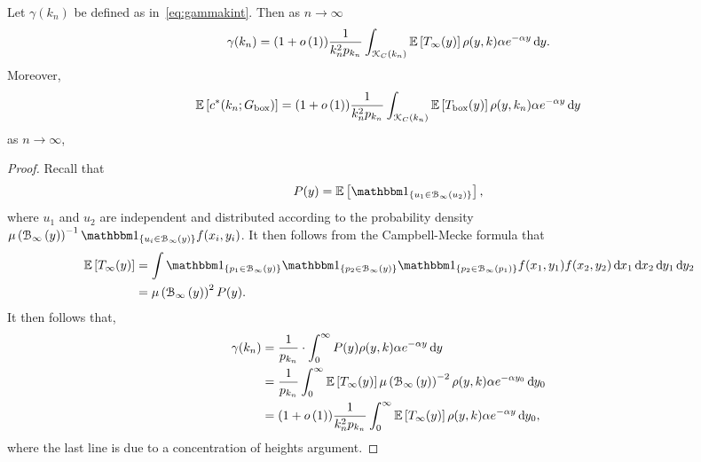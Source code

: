 \begin{lemma}
Let $\gamma(k_n)$ be defined as in~\eqref{eq:gammakint}. Then as $n \to \infty$
\begin{equation}\label{eq:alt_gamma_kn}
	\gamma(k_n) = (1+o\left(1\right))\frac{1}{k_n^2 p_{k_n}} \int_{{\mathcal K}_{C}(k_n)} \mathbb{E}\left[T_\infty(y)\right] \rho(y,k) 
				\alpha e^{-\alpha y} \operatorname{\mathrm{d}\hspace{-2pt}} y. 
\end{equation}
Moreover,
\begin{equation}\label{eq:alt_c_ast_kn}
	\mathbb{E}\left[c^\ast(k_n;G_{\text{box}})\right] = (1 + o\left(1\right)) \frac{1}{k_n^2 p_{k_n}} \int_{{\mathcal K}_{C}(k_n)} \mathbb{E}\left[T_{\text{box}}(y)\right]
		\rho(y,k_n) \alpha e^{-\alpha y} \operatorname{\mathrm{d}\hspace{-2pt}} y
\end{equation}
as $n \to \infty$,
\end{lemma}

\begin{proof}
Recall that 
\[
	P(y) = \Exp{\ind{u_1 \in \BallPo{u_2}}},
\]
where $u_1$ and $u_2$ are independent and distributed according to the probability density \\$\Mu{\BallPo{y}}^{-1} \ind{u_i \in \BallPo{y}} f(x_i, y_i)$. It then follows from the Campbell-Mecke formula that
\begin{align*}
	\Exp{T_\infty(y)} &= \int \ind{p_1 \in \BallPo{y}}\ind{p_2 \in \BallPo{y}}
		\ind{p_2 \in \BallPo{p_1}} f(x_1,y_1) f(x_2,y_2) \dd x_1 \dd x_2 \dd y_1 \dd y_2\\
	&= \Mu{\BallPo{y}}^2 P(y).
\end{align*}
It then follows that,
\begin{align*}
	\gamma(k_n) &= \frac{1}{p_{k_n}} \cdot \int_0^\infty P(y) \rho(y,k) \alpha e^{-\alpha y} \operatorname{\mathrm{d}\hspace{-2pt}} y \\
	&= \frac{1}{p_{k_n}} \int_0^\infty \mathbb{E}\left[T_\infty(y)\right] \mu\left({\mathcal B}_{\infty}\left(y\right)\right)^{-2} \rho(y,k) 
		\alpha e^{-\alpha y_0} \operatorname{\mathrm{d}\hspace{-2pt}} y_0\\
	&= (1+ o\left(1\right)) \frac{1}{k_n^2 p_{k_n}} \int_0^\infty \mathbb{E}\left[T_\infty(y)\right] \rho(y,k) \alpha e^{-\alpha y} \operatorname{\mathrm{d}\hspace{-2pt}} y_0,
\end{align*}
where the last line is due to a concentration of heights argument.


\end{proof}
